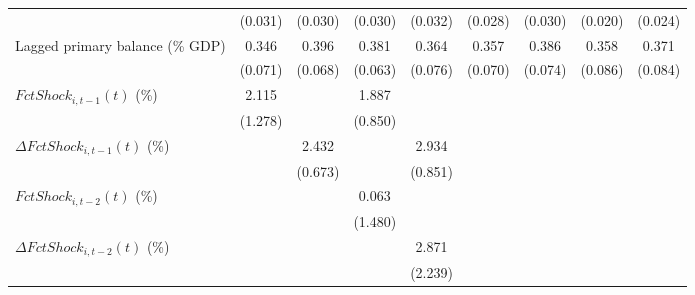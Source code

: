 {\begin{tabular}{l*{8}{c}}
                    &     (0.031)         &     (0.030)         &     (0.030)         &     (0.032)         &     (0.028)         &     (0.030)         &     (0.020)         &     (0.024)         \\
\addlinespace
Lagged primary balance (\% GDP)&       0.346\sym{***}&       0.396\sym{***}&       0.381\sym{***}&       0.364\sym{***}&       0.357\sym{***}&       0.386\sym{***}&       0.358\sym{***}&       0.371\sym{***}\\
                    &     (0.071)         &     (0.068)         &     (0.063)         &     (0.076)         &     (0.070)         &     (0.074)         &     (0.086)         &     (0.084)         \\
\addlinespace
$ FctShock_{i,t-1}(t)$ (\%)&       2.115         &                     &       1.887\sym{**} &                     &                     &                     &                     &                     \\
                    &     (1.278)         &                     &     (0.850)         &                     &                     &                     &                     &                     \\
\addlinespace
$ \Delta FctShock_{i,t-1}(t)$ (\%)&                     &       2.432\sym{***}&                     &       2.934\sym{***}&                     &                     &                     &                     \\
                    &                     &     (0.673)         &                     &     (0.851)         &                     &                     &                     &                     \\
\addlinespace
$ FctShock_{i,t-2}(t)$ (\%)&                     &                     &       0.063         &                     &                     &                     &                     &                     \\
                    &                     &                     &     (1.480)         &                     &                     &                     &                     &                     \\
\addlinespace
$ \Delta FctShock_{i,t-2}(t)$ (\%)&                     &                     &                     &       2.871         &                     &                     &                     &                     \\
                    &                     &                     &                     &     (2.239)         &                     &                     &                     &                     \\

\end{tabular}}
